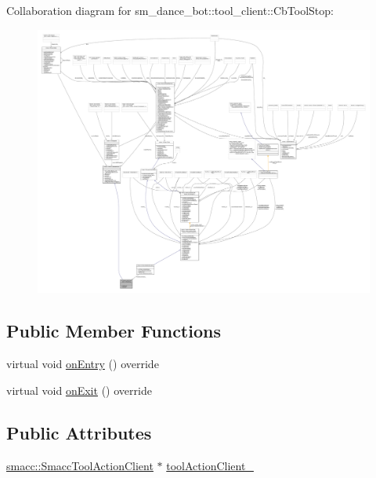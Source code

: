 Collaboration diagram for sm\+\_\+dance\+\_\+bot\+:\+:tool\+\_\+client\+:\+:Cb\+Tool\+Stop\+:
\nopagebreak
\begin{figure}[H]
\begin{center}
\leavevmode
\includegraphics[width=350pt]{classsm__dance__bot_1_1tool__client_1_1CbToolStop__coll__graph}
\end{center}
\end{figure}
\subsection*{Public Member Functions}
\begin{DoxyCompactItemize}
\item 
virtual void \hyperlink{classsm__dance__bot_1_1tool__client_1_1CbToolStop_abfd14b189bb107522360e82f21552f9c}{on\+Entry} () override
\item 
virtual void \hyperlink{classsm__dance__bot_1_1tool__client_1_1CbToolStop_a74e55ce76b4b08c905d623fe9c960790}{on\+Exit} () override
\end{DoxyCompactItemize}
\subsection*{Public Attributes}
\begin{DoxyCompactItemize}
\item 
\hyperlink{classsmacc_1_1SmaccToolActionClient}{smacc\+::\+Smacc\+Tool\+Action\+Client} $\ast$ \hyperlink{classsm__dance__bot_1_1tool__client_1_1CbToolStop_a24bc2a097e7c8ab92c7a7a539720db17}{tool\+Action\+Client\+\_\+}
\end{DoxyCompactItemize}



